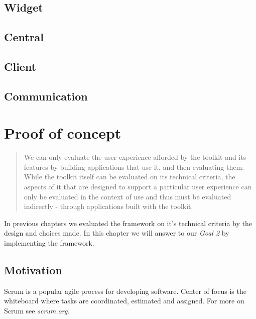 \documentclass[]{report}
\begin{document}
\section{Widget}

\section{Central}

\section{Client}

\section{Communication}



\chapter{Proof of concept}

\blockquote{
We can only evaluate the user experience afforded by the toolkit and its features by building applications that use it, and then evaluating them. While the toolkit itself can be evaluated on its technical criteria, the aspects of it that are designed to support a particular user experience can only be evaluated in the context of use and thus must be evaluated indirectly - through applications built with the toolkit. \cite{Infrastructure (2003)} \\}

In previous chapters we evaluated the framework on it's technical criteria by the design and choices made. In this chapter we will answer to our \textit{Goal 2} by implementing the framework.

\section{Motivation}




Scrum is a popular agile process for developing software. Center of focus is the whiteboard where tasks are coordinated, estimated and assigned. For more on Scrum see \textit{scrum.org}.
\end{document}
